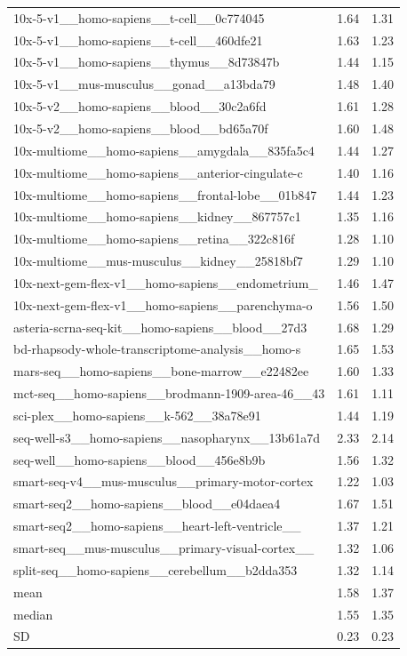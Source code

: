 \begin{table}[H]
{\begin{tabular}{lrr}
10x-5-v1\_\_homo-sapiens\_\_t-cell\_\_0c774045 & 1.64 & 1.31 \\
10x-5-v1\_\_homo-sapiens\_\_t-cell\_\_460dfe21 & 1.63 & 1.23 \\
10x-5-v1\_\_homo-sapiens\_\_thymus\_\_8d73847b & 1.44 & 1.15 \\
10x-5-v1\_\_mus-musculus\_\_gonad\_\_a13bda79 & 1.48 & 1.40 \\
10x-5-v2\_\_homo-sapiens\_\_blood\_\_30c2a6fd & 1.61 & 1.28 \\
10x-5-v2\_\_homo-sapiens\_\_blood\_\_bd65a70f & 1.60 & 1.48 \\
10x-multiome\_\_homo-sapiens\_\_amygdala\_\_835fa5c4 & 1.44 & 1.27 \\
10x-multiome\_\_homo-sapiens\_\_anterior-cingulate-c & 1.40 & 1.16 \\
10x-multiome\_\_homo-sapiens\_\_frontal-lobe\_\_01b847 & 1.44 & 1.23 \\
10x-multiome\_\_homo-sapiens\_\_kidney\_\_867757c1 & 1.35 & 1.16 \\
10x-multiome\_\_homo-sapiens\_\_retina\_\_322c816f & 1.28 & 1.10 \\
10x-multiome\_\_mus-musculus\_\_kidney\_\_25818bf7 & 1.29 & 1.10 \\
10x-next-gem-flex-v1\_\_homo-sapiens\_\_endometrium\_ & 1.46 & 1.47 \\
10x-next-gem-flex-v1\_\_homo-sapiens\_\_parenchyma-o & 1.56 & 1.50 \\
asteria-scrna-seq-kit\_\_homo-sapiens\_\_blood\_\_27d3 & 1.68 & 1.29 \\
bd-rhapsody-whole-transcriptome-analysis\_\_homo-s & 1.65 & 1.53 \\
mars-seq\_\_homo-sapiens\_\_bone-marrow\_\_e22482ee & 1.60 & 1.33 \\
mct-seq\_\_homo-sapiens\_\_brodmann-1909-area-46\_\_43 & 1.61 & 1.11 \\
sci-plex\_\_homo-sapiens\_\_k-562\_\_38a78e91 & 1.44 & 1.19 \\
seq-well-s3\_\_homo-sapiens\_\_nasopharynx\_\_13b61a7d & 2.33 & 2.14 \\
seq-well\_\_homo-sapiens\_\_blood\_\_456e8b9b & 1.56 & 1.32 \\
smart-seq-v4\_\_mus-musculus\_\_primary-motor-cortex & 1.22 & 1.03 \\
smart-seq2\_\_homo-sapiens\_\_blood\_\_e04daea4 & 1.67 & 1.51 \\
smart-seq2\_\_homo-sapiens\_\_heart-left-ventricle\_\_ & 1.37 & 1.21 \\
smart-seq\_\_mus-musculus\_\_primary-visual-cortex\_\_ & 1.32 & 1.06 \\
split-seq\_\_homo-sapiens\_\_cerebellum\_\_b2dda353 & 1.32 & 1.14 \\
\midrule
mean & 1.58 & 1.37 \\
median & 1.55 & 1.35 \\
SD & 0.23 & 0.23 \\
\bottomrule\end{tabular}}\end{table}
